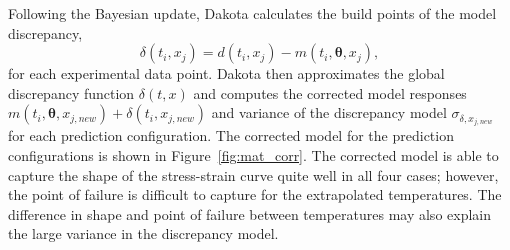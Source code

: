 Following the Bayesian update, Dakota calculates the build points of the model
discrepancy,
\begin{equation}
  \delta(t_{i}, x_{j}) = d(t_{i}, x_{j}) - m(t_{i}, \boldsymbol{\theta}, x_j),
\end{equation}
for each experimental data point. Dakota then approximates the global 
discrepancy function $\delta(t, x)$ and computes the corrected model responses 
$m(t_{i}, \boldsymbol{\theta}, x_{j, new}) + \delta(t_{i}, x_{j, new})$ and 
variance of the discrepancy model $\sigma_{\delta, x_{j, new}}$ for each 
prediction configuration. The corrected model for the prediction configurations
is shown in Figure~\ref{fig:mat_corr}. The corrected model is able to 
capture the shape of the stress-strain curve quite well in all four cases; 
however, the point of failure is difficult to capture for the extrapolated
temperatures. The difference in shape and point of failure between temperatures
may also explain the large variance in the discrepancy model.

